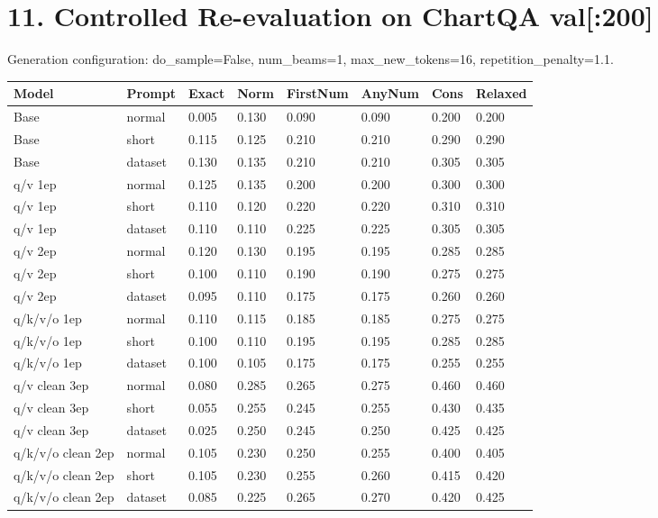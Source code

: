 \documentclass[11pt]{article}
\begin{document}
\section*{11. Controlled Re-evaluation on ChartQA val[:200]}
Generation configuration: do\_sample=False, num\_beams=1, max\_new\_tokens=16, repetition\_penalty=1.1.
\begin{center}\scriptsize\begin{adjustbox}{max width=\textwidth}
\begin{tabular}{llllllll}
\toprule
Model & Prompt & Exact & Norm & FirstNum & AnyNum & Cons & Relaxed \\
\midrule
Base & normal & 0.005 & 0.130 & 0.090 & 0.090 & 0.200 & 0.200 \\
Base & short & 0.115 & 0.125 & 0.210 & 0.210 & 0.290 & 0.290 \\
Base & dataset & 0.130 & 0.135 & 0.210 & 0.210 & 0.305 & 0.305 \\
q/v 1ep & normal & 0.125 & 0.135 & 0.200 & 0.200 & 0.300 & 0.300 \\
q/v 1ep & short & 0.110 & 0.120 & 0.220 & 0.220 & 0.310 & 0.310 \\
q/v 1ep & dataset & 0.110 & 0.110 & 0.225 & 0.225 & 0.305 & 0.305 \\
q/v 2ep & normal & 0.120 & 0.130 & 0.195 & 0.195 & 0.285 & 0.285 \\
q/v 2ep & short & 0.100 & 0.110 & 0.190 & 0.190 & 0.275 & 0.275 \\
q/v 2ep & dataset & 0.095 & 0.110 & 0.175 & 0.175 & 0.260 & 0.260 \\
q/k/v/o 1ep & normal & 0.110 & 0.115 & 0.185 & 0.185 & 0.275 & 0.275 \\
q/k/v/o 1ep & short & 0.100 & 0.110 & 0.195 & 0.195 & 0.285 & 0.285 \\
q/k/v/o 1ep & dataset & 0.100 & 0.105 & 0.175 & 0.175 & 0.255 & 0.255 \\
q/v clean 3ep & normal & 0.080 & 0.285 & 0.265 & 0.275 & 0.460 & 0.460 \\
q/v clean 3ep & short & 0.055 & 0.255 & 0.245 & 0.255 & 0.430 & 0.435 \\
q/v clean 3ep & dataset & 0.025 & 0.250 & 0.245 & 0.250 & 0.425 & 0.425 \\
q/k/v/o clean 2ep & normal & 0.105 & 0.230 & 0.250 & 0.255 & 0.400 & 0.405 \\
q/k/v/o clean 2ep & short & 0.105 & 0.230 & 0.255 & 0.260 & 0.415 & 0.420 \\
q/k/v/o clean 2ep & dataset & 0.085 & 0.225 & 0.265 & 0.270 & 0.420 & 0.425 \\
\bottomrule
\end{tabular}
\end{adjustbox}\end{center}
\end{document}
